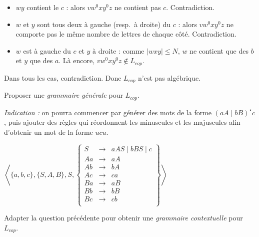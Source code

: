 \begin{exercice}
\begin{corrections}
    \begin{itemize}
    \item $wy$ contient le $c$ : alors $vw^0 x y^0 z$ ne contient pas $c$. Contradiction.
    \item $w$ et $y$ sont tous deux à gauche (resp.\ à droite) du $c$ :
      alors $vw^0 x y^0 z$ ne comporte pas le même nombre de lettres de chaque côté. Contradiction.
    \item $w$ est à gauche du $c$ et $y$ à droite : comme $|wxy|\le N$,
      $w$ ne contient que des $b$ et $y$ que des $a$. Là encore, $vw^0 x y^0 z \notin L_{\mathit{cop}}$.
    \end{itemize}

    Dans tous les cas, contradiction. Donc $L_{\mathit{cop}}$ n’est pas algébrique.
  \end{corrections}

  \ifcorrection{\newpage}
  \begin{questions}
  \item Proposer une \emph{grammaire générale} pour $L_{\mathit{cop}}$.

    \emph{Indication :} on pourra commencer par générer des mots de la forme
    $(aA \mid bB)^\star c$, puis ajouter des règles qui réordonnent les
    minuscules et les majuscules afin d'obtenir un mot de la forme $u c u$.
  \end{questions}
  \begin{corrections}
    $\left\langle \{a, b, c\}, \{S, A, B\}, S,
    \left\{\begin{array}{rcl}
    S   &\rightarrow& aA S \mid bB S \mid c\\
    Aa &\rightarrow& aA\\
    Ab &\rightarrow& bA\\
    Ac &\rightarrow& ca\\
    Ba &\rightarrow& aB\\
    Bb &\rightarrow& bB\\
    Bc &\rightarrow& cb\\
    \end{array}\right\}  \right\rangle$
  \end{corrections}

  \begin{questions}
  \item Adapter la question précédente pour obtenir une \emph{grammaire contextuelle}
    pour $L_{\mathit{cop}}$.


\end{questions}
\end{exercice}
